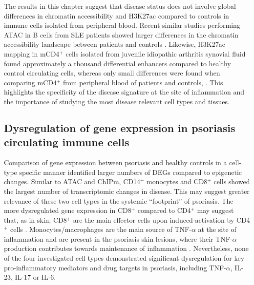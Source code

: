 The results in this chapter suggest that disease status does not involve global differences in chromatin accessibility and H3K27ac compared to controls in immune cells isolated from peripheral blood. Recent similar studies performing ATAC in B cells from SLE patients showed larger differences in the chromatin accessibility landscape between patients and controls \parencite{Scharer2016}. Likewise, H3K27ac mapping in mCD4$^+$ cells isolated from juvenile idiopathic arthritis synovial fluid found approximately a thousand differential enhancers compared to healthy control circulating cells, whereas only small differences were found when comparing mCD4$^+$ from peripheral blood of patients and controls, \parencite{Peeters2015}. This highlights the specificity of the disease signature at the site of inflammation and the importance of studying the most disease relevant cell types and tissues.




\subsection{Dysregulation of gene expression in psoriasis circulating immune cells}

Comparison of gene expression between psoriasis and healthy controls in a cell-type specific manner identified larger numbers of DEGs compared to epigenetic changes. Similar to ATAC and ChIPm, CD14$^+$ monocytes and CD8$^+$ cells showed the largest number of transcriptomic changes in disease. This may suggest greater relevance of these two cell types in the systemic “footprint” of psoriasis. The more dysregulated gene expression in CD8$^+$ compared to CD4$^+$ may suggest that, as in skin, CD8$^+$ are the main effector cells upon induced-activation by CD4$^+$ cells \parencite{Nickoloff1999}. Monocytes/macrophages are the main source of TNF-$\alpha$ at the site of inflammation and are present in the  psoriasis skin lesions, where their TNF-$\alpha$ production contributes towards maintenance of inflammation \parencite{Parameswaran2010,Nickoloff2007,Wang2006}. Nevertheless, none of the four investigated cell types demonstrated  significant dysregulation for key pro-inflammatory mediators and drug targets in psoriasis, including TNF-$\alpha$, IL-23, IL-17 or IL-6.

